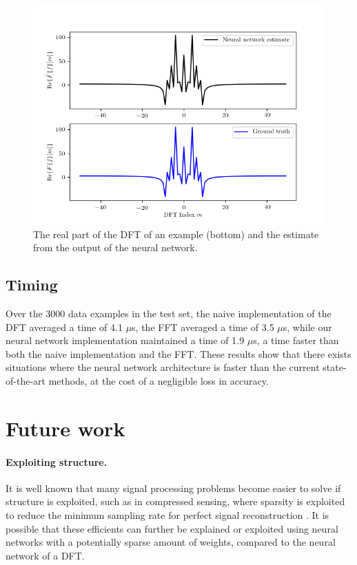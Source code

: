 \documentclass[12pt]{article}
\begin{document}
\begin{figure}
\centering
\includegraphics[scale=.65]{figures/DFT_comparisons.png}
\caption{The real part of the DFT of an example (bottom) and the estimate from the output of the neural network.}
\label{f-DFT_compare}
\end{figure}

\subsection{Timing}
Over the 3000 data examples in the test set, the naive implementation of the DFT averaged a time of 4.1 $\mu$s,
the FFT averaged a time of 3.5 $\mu$s, while our neural network implementation maintained a time of 1.9 $\mu$s, a time
faster than both the naive implementation and the FFT. These results show that there exists situations where the neural
network architecture is faster than the current state-of-the-art methods, at the cost of a negligible loss in accuracy.

\section{Future work}

\paragraph{Exploiting structure.} It is well known that many signal processing problems become easier to solve if structure is
exploited, such as in compressed sensing, where sparsity is exploited to reduce the minimum sampling rate for perfect signal
reconstruction \cite{D:06}. It is possible that these efficients can further be explained or exploited using neural networks
with a potentially sparse amount of weights, compared to the neural network of a DFT.
\end{document}
